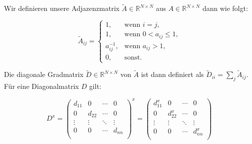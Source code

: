 \documentclass{scrartcl}
\begin{document}
Wir definieren unsere Adjazenzmatrix $\tilde A \in \mathbb{R}^{N \times N}$ aus $A \in \mathbb{R}^{N \times N}$ dann wie folgt:

\begin{equation}
  \tilde A_{ij} = \begin{cases}
    1, & \text{wenn }i=j\text{,}\\
    1, & \text{wenn }0 < a_{ij} \leq 1\text{,}\\
    a_{ij}^{-1}, & \text{wenn }a_{ij} > 1\text{,}\\
    0, & \text{sonst.}
  \end{cases}
\end{equation}


Die diagonale Gradmatrix $\tilde D \in \mathbb{R}^{N \times N}$ von $\tilde A$ ist dann definiert als $\tilde D_{ii} = \sum_j \tilde A_{ij}$.
Für eine Diagonalmatrix $D$ gilt:

\begin{equation}
  D^x = \begin{pmatrix}
    d_{11} & 0 & \cdots & 0\\
    0 & d_{22} & \cdots & 0\\
    \vdots & \vdots & \ddots & \vdots\\
    0 & 0 & \cdots & d_{nn}\\
  \end{pmatrix}^x = \begin{pmatrix}
    d_{11}^x & 0 & \cdots & 0\\
    0 & d_{22}^x & \cdots & 0\\
    \vdots & \vdots & \ddots & \vdots\\
    0 & 0 & \cdots & d_{nn}^x\\
  \end{pmatrix}
\end{equation}
\end{document}
